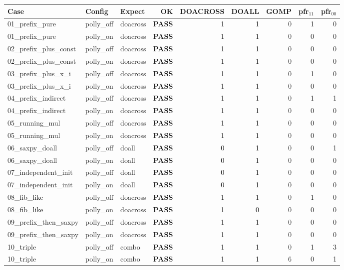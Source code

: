 \documentclass[11pt,a4paper]{article}
\newcommand{\passmark}{\textcolor{pass}{\textbf{PASS}}}
\begin{document}
\begin{center}
\small
\begin{longtable}{lllrrrrrr}
\toprule
Case & Config & Expect & OK & DOACROSS & DOALL & GOMP & pfr$_{11}$ & pfr$_{00}$ \\
\midrule
\endhead
01\_prefix\_pure & polly\_off & doacross & \passmark & 1 & 1 & 0 & 1 & 0 \\
01\_prefix\_pure & polly\_on  & doacross & \passmark & 1 & 1 & 0 & 0 & 0 \\
02\_prefix\_plus\_const & polly\_off & doacross & \passmark & 1 & 1 & 0 & 0 & 0 \\
02\_prefix\_plus\_const & polly\_on  & doacross & \passmark & 1 & 1 & 0 & 0 & 0 \\
03\_prefix\_plus\_x\_i & polly\_off & doacross & \passmark & 1 & 1 & 0 & 1 & 0 \\
03\_prefix\_plus\_x\_i & polly\_on  & doacross & \passmark & 1 & 1 & 0 & 0 & 0 \\
04\_prefix\_indirect & polly\_off & doacross & \passmark & 1 & 1 & 0 & 1 & 1 \\
04\_prefix\_indirect & polly\_on  & doacross & \passmark & 1 & 1 & 0 & 0 & 0 \\
05\_running\_mul & polly\_off & doacross & \passmark & 1 & 1 & 0 & 0 & 0 \\
05\_running\_mul & polly\_on  & doacross & \passmark & 1 & 1 & 0 & 0 & 0 \\
06\_saxpy\_doall & polly\_off & doall & \passmark & 0 & 1 & 0 & 0 & 1 \\
06\_saxpy\_doall & polly\_on  & doall & \passmark & 0 & 1 & 0 & 0 & 0 \\
07\_independent\_init & polly\_off & doall & \passmark & 0 & 1 & 0 & 0 & 0 \\
07\_independent\_init & polly\_on  & doall & \passmark & 0 & 1 & 0 & 0 & 0 \\
08\_fib\_like & polly\_off & doacross & \passmark & 1 & 1 & 0 & 1 & 0 \\
08\_fib\_like & polly\_on  & doacross & \passmark & 1 & 0 & 0 & 0 & 0 \\
09\_prefix\_then\_saxpy & polly\_off & doacross & \passmark & 1 & 1 & 0 & 0 & 0 \\
09\_prefix\_then\_saxpy & polly\_on  & doacross & \passmark & 1 & 1 & 0 & 0 & 0 \\
10\_triple & polly\_off & combo & \passmark & 1 & 1 & 0 & 1 & 3 \\
10\_triple & polly\_on  & combo & \passmark & 1 & 1 & 6 & 0 & 1 \\
\bottomrule
\end{longtable}
\end{center}
\end{document}
